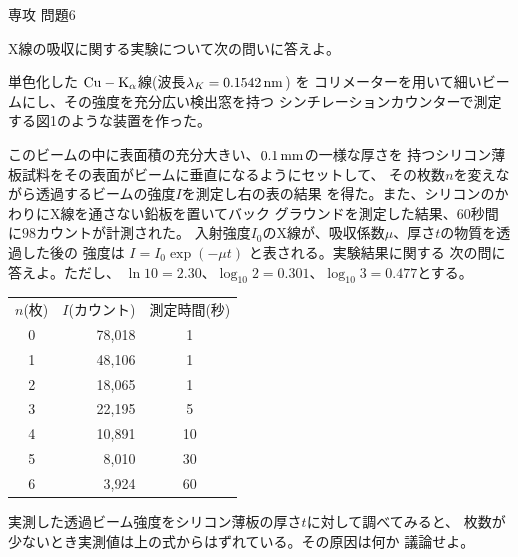 \documentclass[fleqn]{jbook}
\begin{document}
\begin{question}{専攻 問題6}{}

\def\CuK{${\rm Cu-K}_{\alpha}$}
\def\MoK{${\rm Mo-K}_{\alpha}$}

X線の吸収に関する実験について次の問いに答えよ。

\begin{subquestions}
\SubQuestion
  単色化した \CuK 線(波長$\lambda_{K}=0.1542\,{\rm nm}$) を
  コリメーターを用いて細いビームにし、その強度を充分広い検出窓を持つ
  シンチレーションカウンターで測定する図1のような装置を作った。
%
  \begin{center}
  \end{center}
%
  \parbox[t]{98mm}{
  このビームの中に表面積の充分大きい、$0.1\,{\rm mm}$の一様な厚さを
  持つシリコン薄板試料をその表面がビームに垂直になるようにセットして、
  その枚数$n$を変えながら透過するビームの強度$I$を測定し右の表の結果
  を得た。また、シリコンのかわりにX線を通さない鉛板を置いてバック
  グラウンドを測定した結果、$60$秒間に$98$カウントが計測された。
  入射強度$I_{0}$のX線が、吸収係数$\mu$、厚さ$t$の物質を透過した後の
  強度は $I = I_{0} \exp{(-\mu t)} $ と表される。実験結果に関する
  次の問に答えよ。ただし、
  $\ln{10}=2.30$、$\log_{10}{2}=0.301$、$\log_{10}{3}=0.477$とする。
%
  }\parbox[t]{62mm}{\vspace*{-5mm}
%
  \begin{center}
  \begin{tabular}{|crc|}\hline 
  $n$(枚)& $I$(カウント) & 測定時間(秒) \\
     0   &  78,018 &   1   \\
     1   &  48,106 &   1   \\
     2   &  18,065 &   1   \\
     3   &  22,195 &   5   \\
     4   &  10,891 &  10   \\
     5   &   8,010 &  30   \\
     6   &   3,924 &  60   \\ \hline
  \end{tabular}
  \end{center}
  }

  \begin{subsubquestions}
  \SubSubQuestion
    実測した透過ビーム強度をシリコン薄板の厚さ$t$に対して調べてみると、
    枚数が少ないとき実測値は上の式からはずれている。その原因は何か
    議論せよ。


\end{subsubquestions}
\end{subquestions}
\end{question}
\end{document}
